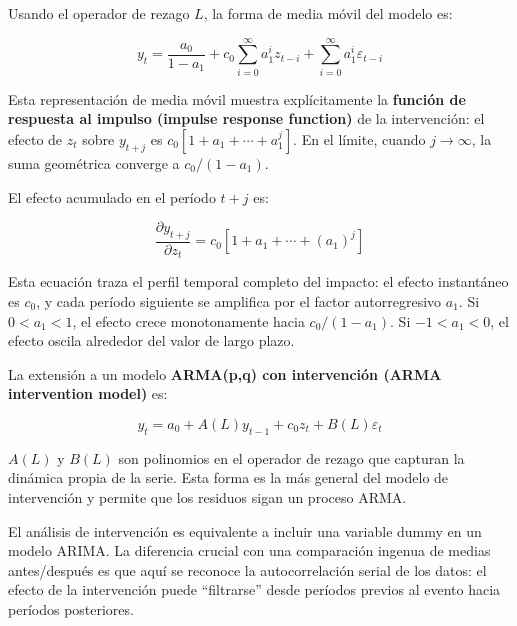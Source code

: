 \documentclass[12pt]{article}
\begin{document}
Usando el operador de rezago $L$, la forma de media m\'ovil del modelo es:

\begin{equation}
y_t = \frac{a_0}{1-a_1} + c_0 \sum_{i=0}^{\infty} a_1^i z_{t-i} + \sum_{i=0}^{\infty} a_1^i \varepsilon_{t-i}
\end{equation}

\begin{intuicionmat}
Esta representaci\'on de media m\'ovil muestra expl\'icitamente la \textbf{funci\'on de respuesta al impulso (impulse response function)} de la intervenci\'on: el efecto de $z_t$ sobre $y_{t+j}$ es $c_0[1 + a_1 + \cdots + a_1^j]$. En el l\'imite, cuando $j \to \infty$, la suma geom\'etrica converge a $c_0/(1-a_1)$.
\end{intuicionmat}

El efecto acumulado en el per\'iodo $t+j$ es:

\begin{equation}
\frac{\partial y_{t+j}}{\partial z_t} = c_0[1 + a_1 + \cdots + (a_1)^j]
\end{equation}

\begin{intuicionmat}
Esta ecuaci\'on traza el perfil temporal completo del impacto: el efecto instant\'aneo es $c_0$, y cada per\'iodo siguiente se amplifica por el factor autorregresivo $a_1$. Si $0 < a_1 < 1$, el efecto crece monotonamente hacia $c_0/(1-a_1)$. Si $-1 < a_1 < 0$, el efecto oscila alrededor del valor de largo plazo.
\end{intuicionmat}

La extensi\'on a un modelo \textbf{ARMA(p,q) con intervenci\'on (ARMA intervention model)} es:

\begin{equation}
y_t = a_0 + A(L)y_{t-1} + c_0 z_t + B(L)\varepsilon_t
\end{equation}

\begin{intuicionmat}
$A(L)$ y $B(L)$ son polinomios en el operador de rezago que capturan la din\'amica propia de la serie. Esta forma es la m\'as general del modelo de intervenci\'on y permite que los residuos sigan un proceso ARMA.
\end{intuicionmat}

\begin{intuicion}
El an\'alisis de intervenci\'on es equivalente a incluir una variable dummy en un modelo ARIMA. La diferencia crucial con una comparaci\'on ingenua de medias antes/despu\'es es que aqu\'i se reconoce la autocorrelaci\'on serial de los datos: el efecto de la intervenci\'on puede ``filtrarse'' desde per\'iodos previos al evento hacia per\'iodos posteriores.
\end{intuicion}
\end{document}
